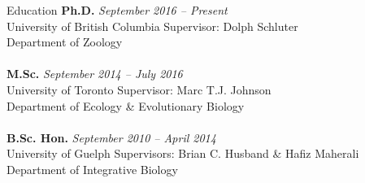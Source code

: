 \documentclass[11pt]{article}
\begin{document}
\noindent\begin{rSection}{Education}
\vspace{0.5em}
\noindent
{\bf Ph.D.} \hfill {\em September 2016 -- Present} 
\\ University of British Columbia \hfill { Supervisor: Dolph Schluter}
\\ Department of Zoology \\

\noindent
\\{\bf M.Sc.} \hfill {\em September 2014 -- July 2016} 
\\ University of Toronto\hfill { Supervisor: Marc T.J. Johnson}
\\ Department of Ecology \& Evolutionary Biology \\

\noindent
\\{\bf B.Sc. Hon.} \hfill {\em September 2010 -- April 2014} 
\\ University of Guelph\hfill { Supervisors: Brian C. Husband \& Hafiz Maherali}
\\ Department of Integrative Biology \\

\end{rSection}

\end{document}
